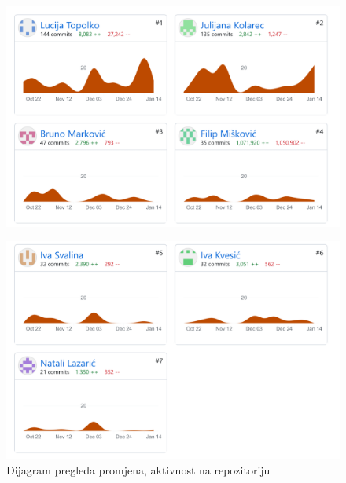 		\begin{figure}[H]
			\includegraphics[width=\textwidth]{slike/promjene1.png}
		\end{figure}
		
			\begin{figure}[H]
			\includegraphics[width=\textwidth]{slike/promjene2.png}
			\centering
			\caption{Dijagram pregleda promjena, aktivnost na repozitoriju}
		\end{figure}
		
	